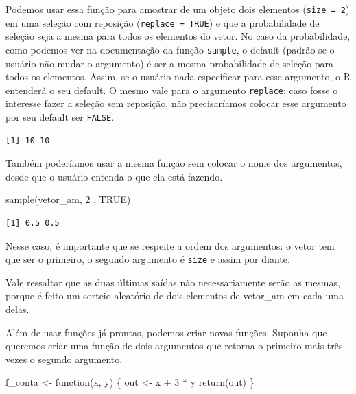 \documentclass[
  letterpaper,
  DIV=11,
  numbers=noendperiod]{scrreprt}
\newenvironment{Shaded}{\begin{snugshade}}{\end{snugshade}}
\newcommand{\ConstantTok}[1]{\textcolor[rgb]{0.56,0.35,0.01}{#1}}
\newcommand{\ControlFlowTok}[1]{\textcolor[rgb]{0.00,0.23,0.31}{#1}}
\newcommand{\DecValTok}[1]{\textcolor[rgb]{0.68,0.00,0.00}{#1}}
\newcommand{\FunctionTok}[1]{\textcolor[rgb]{0.28,0.35,0.67}{#1}}
\newcommand{\NormalTok}[1]{\textcolor[rgb]{0.00,0.23,0.31}{#1}}
\newcommand{\OtherTok}[1]{\textcolor[rgb]{0.00,0.23,0.31}{#1}}
\newcommand{\SpecialCharTok}[1]{\textcolor[rgb]{0.37,0.37,0.37}{#1}}
\begin{document}
Podemos usar essa função para amostrar de um objeto dois elementos
(\texttt{size\ =\ 2}) em uma seleção com reposição
(\texttt{replace\ =\ TRUE}) e que a probabilidade de seleção seja a
mesma para todos os elementos do vetor. No caso da probabilidade, como
podemos ver na documentação da função \texttt{sample}, o default (padrão
se o usuário não mudar o argumento) é ser a mesma probabilidade de
seleção para todos os elementos. Assim, se o usuário nada especificar
para esse argumento, o R entenderá o seu default. O mesmo vale para o
argumento \texttt{replace}: caso fosse o interesse fazer a seleção sem
reposição, não precisaríamos colocar esse argumento por seu default ser
\texttt{FALSE}.

\begin{verbatim}
[1] 10 10
\end{verbatim}

Também poderíamos usar a mesma função sem colocar o nome dos argumentos,
desde que o usuário entenda o que ela está fazendo.

\begin{Shaded}
\begin{Highlighting}[]
\FunctionTok{sample}\NormalTok{(vetor\_am, }\DecValTok{2}\NormalTok{ , }\ConstantTok{TRUE}\NormalTok{) }
\end{Highlighting}
\end{Shaded}

\begin{verbatim}
[1] 0.5 0.5
\end{verbatim}

Nesse caso, é importante que se respeite a ordem dos argumentos: o vetor
tem que ser o primeiro, o segundo argumento é \texttt{size} e assim por
diante.

Vale ressaltar que as duas últimas saídas não necessariamente serão as
mesmas, porque é feito um sorteio aleatório de dois elementos de
vetor\_am em cada uma delas.

Além de usar funções já prontas, podemos criar novas funções. Suponha
que queremos criar uma função de dois argumentos que retorna o primeiro
mais três vezes o segundo argumento.

\begin{Shaded}
\begin{Highlighting}[]
\NormalTok{f\_conta }\OtherTok{\textless{}{-}} \ControlFlowTok{function}\NormalTok{(x, y) \{}
\NormalTok{  out }\OtherTok{\textless{}{-}}\NormalTok{ x }\SpecialCharTok{+} \DecValTok{3} \SpecialCharTok{*}\NormalTok{ y}
  \FunctionTok{return}\NormalTok{(out)}
\NormalTok{\}}
\end{Highlighting}
\end{Shaded}
\end{document}
